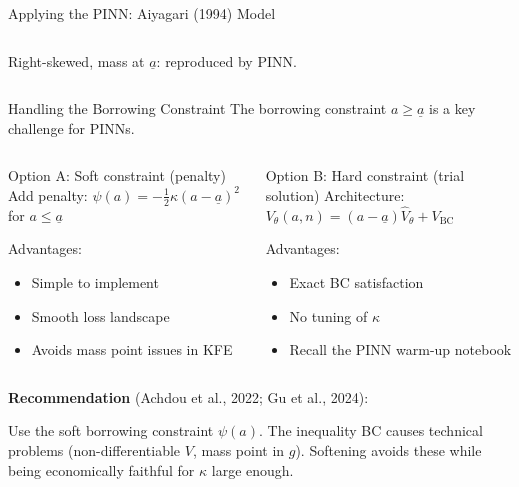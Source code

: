 \documentclass[aspectratio=169,11pt]{beamer}
\newcommand{\emphc}[1]{\textcolor{harvardcrimson}{#1}}
\newcommand{\ubar}[1]{\underline{#1}}
\begin{document}
\begin{frame}[shrink=15]{Applying the PINN: Aiyagari (1994) Model}
\begin{columns}[T]
{\small Right-skewed, mass at $\ubar{a}$: reproduced by PINN.}
\end{columns}
\end{frame}

\begin{frame}{Handling the Borrowing Constraint}
\small
The borrowing constraint $a \geq \ubar{a}$ is a key challenge for PINNs.

\vspace{0.1em}
\begin{columns}[T]
\begin{block}{Option A: Soft constraint (penalty)}
\footnotesize
Add penalty: $\psi(a) = -\tfrac{1}{2}\kappa(a - \ubar{a})^2$ for $a \leq \ubar{a}$

\vspace{0.1em}
Advantages:
\begin{itemize}\itemsep0pt
    \item Simple to implement
    \item Smooth loss landscape
    \item Avoids mass point issues in KFE
\end{itemize}
\end{block}

\begin{block}{Option B: Hard constraint (trial solution)}
\footnotesize
Architecture: $V_\theta(a,n) = (a - \ubar{a})\hat{V}_\theta + V_{\text{BC}}$

\vspace{0.1em}
Advantages:
\begin{itemize}\itemsep0pt
    \item Exact BC satisfaction
    \item No tuning of $\kappa$
    \item Recall the PINN warm-up notebook
\end{itemize}
\end{block}
\end{columns}

\vspace{0.1em}
\textbf{Recommendation} (Achdou et al., 2022; Gu et al., 2024):
\begin{center}
\colorbox{uzhgreylight}{\parbox{0.8\textwidth}{\centering\footnotesize
Use the \emphc{soft borrowing constraint} $\psi(a)$. The inequality BC causes technical problems (non-differentiable $V$, mass point in $g$). Softening avoids these while being economically faithful for $\kappa$ large enough.}}
\end{center}
\end{frame}
\end{document}
